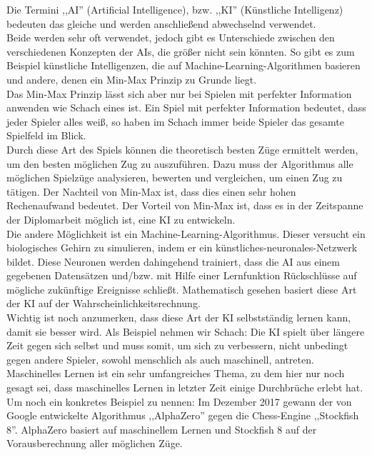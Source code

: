 \documentclass[12pt,a4paper]{article}
\begin{document}
Die Termini ,,AI'' (Artificial Intelligence), bzw. ,,KI'' (Künstliche Intelligenz) bedeuten das gleiche und werden anschließend abwechselnd verwendet. \\
Beide werden sehr oft verwendet, jedoch gibt es Unterschiede zwischen den verschiedenen Konzepten der AIs, die größer nicht sein könnten. So gibt es zum Beispiel künstliche Intelligenzen, die auf Machine-Learning-Algorithmen basieren und andere, denen ein Min-Max Prinzip zu Grunde liegt. \\
Das Min-Max Prinzip lässt sich aber nur bei Spielen mit perfekter Information anwenden wie Schach eines ist. Ein Spiel mit perfekter Information bedeutet, dass jeder Spieler alles weiß, so haben im Schach immer beide Spieler das gesamte Spielfeld im Blick. \\[2ex]
Durch diese Art des Spiels können die theoretisch besten Züge ermittelt werden, um den besten möglichen Zug zu auszuführen. Dazu muss der Algorithmus alle möglichen Spielzüge analysieren, bewerten und vergleichen, um einen Zug zu tätigen. Der Nachteil von Min-Max ist, dass dies einen sehr hohen Rechenaufwand bedeutet. Der Vorteil von Min-Max ist, dass es in der Zeitspanne der Diplomarbeit möglich ist, eine KI zu entwickeln.\\[2ex]
Die andere Möglichkeit ist ein Machine-Learning-Algorithmus. Dieser versucht ein biologisches Gehirn zu simulieren, indem er ein künstliches-neuronales-Netzwerk bildet. Diese Neuronen werden dahingehend trainiert, dass die AI aus einem gegebenen Datensätzen und/bzw. mit Hilfe einer Lernfunktion Rückschlüsse auf mögliche zukünftige Ereignisse schließt. Mathematisch gesehen basiert diese Art der KI auf der Wahrscheinlichkeitsrechnung.  \\
Wichtig ist noch anzumerken, dass diese Art der KI selbstständig lernen kann, damit sie besser wird. Als Beispiel nehmen wir Schach: Die KI spielt über längere Zeit gegen sich selbst und muss somit, um sich zu verbessern, nicht unbedingt gegen andere Spieler, sowohl menschlich als auch maschinell, antreten. \\
Maschinelles Lernen ist ein sehr umfangreiches Thema, zu dem hier nur noch gesagt sei, dass maschinelles Lernen in letzter Zeit einige Durchbrüche erlebt hat. Um noch ein konkretes Beispiel zu nennen: Im Dezember 2017 gewann der von Google entwickelte Algorithmus ,,AlphaZero'' gegen die Chess-Engine ,,Stockfish 8''. AlphaZero basiert auf maschinellem Lernen und Stockfish 8 auf der Vorausberechnung aller möglichen Züge.\cite{SkyNet} \\[2ex]
\end{document}

